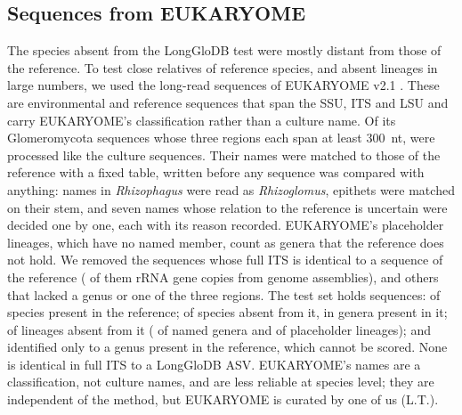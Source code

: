 \documentclass[11pt]{article}
\newcommand{\spn}[1]{\emph{#1}}   %
\begin{document}
\subsection{Sequences from EUKARYOME}\label{sec:euk-methods}
The species absent from the LongGloDB test were mostly distant from those of the reference. To test close relatives
of reference species, and absent lineages in large numbers, we used the long-read sequences of EUKARYOME v2.1
\cite{tedersoo2024eukaryome}. These are environmental and reference sequences that span the SSU, ITS and LSU and
carry EUKARYOME's classification rather than a culture name. Of its \EkReads{} Glomeromycota sequences whose three
regions each span at least 300~nt, \EkWindows{} were processed like the culture sequences. Their names were matched
to those of the reference with a fixed table, written before any sequence was compared with anything: names in
\spn{Rhizophagus} were read as \spn{Rhizoglomus}, epithets were matched on their stem, and seven names whose relation
to the reference is uncertain were decided one by one, each with its reason recorded. EUKARYOME's placeholder
lineages, which have no named member, count as genera that the reference does not hold. We removed the
\EkIdenticalN{} sequences whose full ITS is identical to a sequence of the reference (\EkIdenticalAssembly{} of them
rRNA gene copies from genome assemblies), and \EkOtherRemovedN{} others that lacked a genus or one of the three
regions. The test set holds \EkTestN{} sequences: \EkKnownN{} of \EkKnownSpecies{} species present in the reference;
\EkNovelSpN{} of \EkNovelSpSpecies{} species absent from it, in genera present in it; \EkNovelLinN{} of lineages
absent from it (\EkNovelLinNamedN{} of \EkNovelLinGenera{} named genera and \EkPlaceholderN{} of
\EkPlaceholderTaxa{} placeholder lineages); and \EkGenusOnlyN{} identified only to a genus present in the reference,
which cannot be scored. None is identical in full ITS to a LongGloDB ASV. EUKARYOME's names are a classification,
not culture names, and are less reliable at species level; they are independent of the method, but EUKARYOME is
curated by one of us (L.T.).
\end{document}
